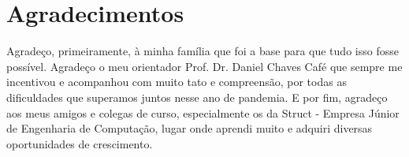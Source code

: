 \chapter*{Agradecimentos}

Agradeço, primeiramente, à minha família que foi a base para que tudo isso fosse possível. Agradeço o meu orientador Prof. Dr. Daniel Chaves Café que sempre me incentivou e acompanhou com muito tato e compreensão, por todas as dificuldades que superamos juntos nesse ano de pandemia. E por fim, agradeço aos meus amigos e colegas de curso, especialmente os da Struct - Empresa Júnior de Engenharia de Computação, lugar onde aprendi muito e adquiri diversas oportunidades de crescimento. 